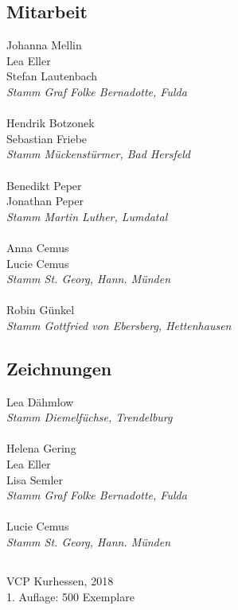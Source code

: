 \begin{centering}
\begin{multicols}{2}
\subsection*{Mitarbeit}
Johanna Mellin \\ Lea Eller \\ Stefan Lautenbach \\ \textit{Stamm Graf Folke Bernadotte, Fulda} \\ ~\\
Hendrik Botzonek \\ Sebastian Friebe \\ \textit{Stamm Mückenstürmer, Bad Hersfeld} \\ ~\\
Benedikt Peper \\ Jonathan Peper \\ \textit{Stamm Martin Luther, Lumdatal} \\ ~\\
Anna Cemus \\ Lucie Cemus \\ \textit{Stamm St. Georg, Hann. Münden} \\ ~\\
Robin Günkel \\ \textit{Stamm Gottfried von Ebersberg, Hettenhausen} \\

\subsection*{Zeichnungen}
Lea Dähmlow \\ \textit{Stamm Diemelfüchse, Trendelburg} \\ ~\\
Helena Gering \\ Lea Eller \\ Lisa Semler \\ \textit{Stamm Graf Folke Bernadotte, Fulda} \\ ~\\
Lucie Cemus \\ \textit{Stamm St. Georg, Hann. Münden} \\

\end{multicols}

\vfill

\subsection*{}
VCP Kurhessen, 2018 \\
1. Auflage: 500 Exemplare

\end{centering}

